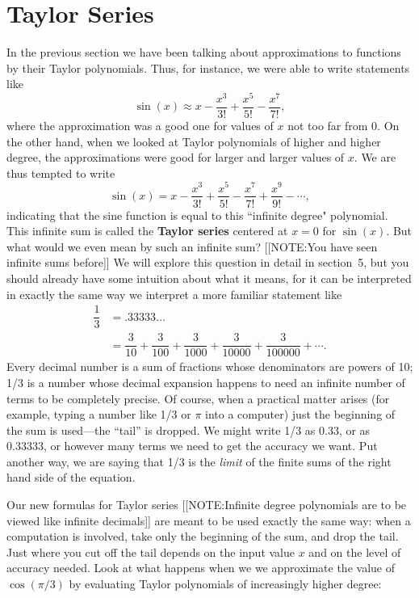 \section{Taylor Series}
\label{sec:taylor-series}

In the previous section we have been talking about approximations to
functions by their Taylor polynomials.  Thus, for instance, we were
able to write statements like
\[
\sin(x) \approx x - \dfrac{x^3}{3!} + \dfrac{x^5}{5!} - \dfrac{x^7}{7!},
\]
where the approximation was a good one for values of $x$ not too far
from 0.  On the other hand, when we looked at Taylor polynomials of
higher and higher degree, the approximations were good for larger and
larger values of $x$. We are thus tempted to write
\[
\sin(x) = x - \dfrac{x^3}{3!} + \dfrac{x^5}{5!} 
                - \dfrac{x^7}{7!} + \dfrac{x^9}{9!} - \cdots ,
\]
indicating that the sine function is equal to this ``infinite degree"
polynomial.  This infinite sum is called the {\bf Taylor
  series} centered at $x=0$ for
$\sin(x)$.  But what would we even mean by such an infinite sum?
[[NOTE:You have seen  infinite sums before]]
We will explore this question in detail in section~5, but you should
already have some intuition about what it means, for it can be
interpreted in exactly the same way we interpret a more familiar
statement like
\begin{align*}
\dfrac{1}{3} 
    &= .33333 \ldots \\
    &= \dfrac{3}{10} + \dfrac{3}{100} + \dfrac{3}{1000}
           + \dfrac{3}{10000} + \dfrac{3}{100000} + \cdots .
\end{align*}
Every decimal number is a sum of fractions whose denominators are
powers of 10; 1/3 is a number whose decimal expansion happens to need
an infinite number of terms to be completely precise.  Of course, when
a practical matter arises (for example, typing a number like 1/3 or
$\pi$ into a computer) just the beginning of the sum is used---the
``tail'' is dropped.  We might write 1/3 as 0.33, or as 0.33333, or
however many terms we need to get the accuracy we want.  Put another
way, we are saying that 1/3 is the {\em limit} of the finite sums of
the right hand side of the equation.

Our new formulas for Taylor series 
[[NOTE:Infinite degree polynomials are to be viewed like infinite decimals]]
are meant to be used exactly the same way: when a computation is
involved, take only the beginning of the sum, and drop the tail.  Just
where you cut off the tail depends on the input value $x$ and on the
level of accuracy needed.  Look at what happens when we we approximate
the value of $\cos(\pi/3)$ by evaluating Taylor polynomials of
increasingly higher degree: 




